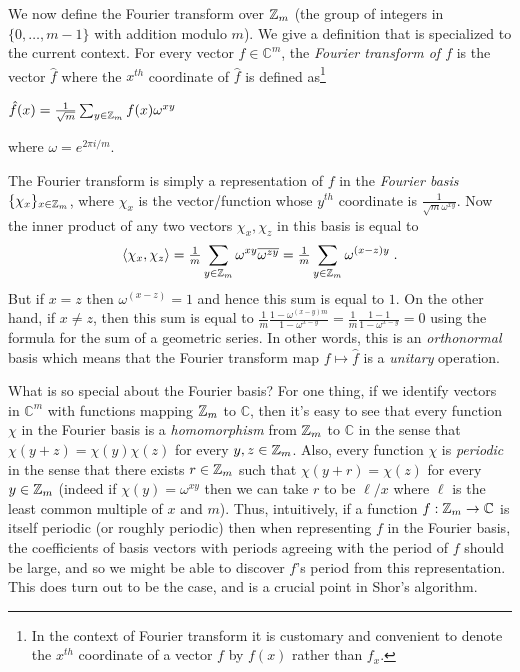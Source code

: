 We now define the Fourier transform over \({\mathbb{Z}}_m\) (the group of integers
in \(\{0,\ldots,m-1\}\) with addition modulo \(m\)). We give a
definition that is specialized to the current context. For every vector
\(f\in\mathbb{C}^m\), the \emph{Fourier transform of \(f\)} is the
vector \(\hat{f}\) where the \(x^{th}\) coordinate of \(\hat{f}\) is
defined as\footnote{In the context of Fourier transform it is customary
  and convenient to denote the \(x^{th}\) coordinate of a vector \(f\)
  by \(f(x)\) rather than \(f_x\).}

\(\hat{f}(x) = \tfrac{1}{\sqrt{m}}\sum_{y\in{\mathbb{Z}}_m} f(x)\omega^{xy}\)

where \(\omega = e^{2\pi i/m}\).

The Fourier transform is simply a representation of \(f\) in the
\emph{Fourier basis} \(\{ \chi_x \}_{x \in {\mathbb{Z}}_m}\), where \(\chi_x\) is
the vector/function whose \(y^{th}\) coordinate is
\(\tfrac{1}{\sqrt{m}\omega^{xy}}\). Now the inner product of any two
vectors \(\chi_x,\chi_z\) in this basis is equal to
\[\langle \chi_x,\chi_z \rangle = \tfrac{1}{m}\sum_{y\in{\mathbb{Z}}_m} \omega^{xy} \overline{\omega^{zy}} = \tfrac{1}{m}\sum_{y\in{\mathbb{Z}}_m} \omega^{(x-z)y}  \;.\]
But if \(x=z\) then \(\omega^{(x-z)}=1\) and hence this sum is equal to
\(1\). On the other hand, if \(x \neq z\), then this sum is equal to
\(\tfrac{1}{m} \tfrac{1 -\omega^{(x-y)m}}{1-\omega^{x-y}}= \tfrac{1}{m}\tfrac{1-1}{1-\omega^{x-y}}=0\)
using the formula for the sum of a geometric series. In other words,
this is an \emph{orthonormal} basis which means that the Fourier
transform map \(f \mapsto \hat{f}\) is a \emph{unitary} operation.

What is so special about the Fourier basis? For one thing, if we
identify vectors in \(\mathbb{C}^m\) with functions mapping \({\mathbb{Z}}_m\) to
\(\mathbb{C}\), then it's easy to see that every function \(\chi\) in
the Fourier basis is a \emph{homomorphism} from \({\mathbb{Z}}_m\) to
\(\mathbb{C}\) in the sense that \(\chi(y+z)= \chi(y)\chi(z)\) for every
\(y,z \in {\mathbb{Z}}_m\). Also, every function \(\chi\) is \emph{periodic} in
the sense that there exists \(r\in {\mathbb{Z}}_m\) such that
\(\chi(y+r)=\chi(z)\) for every \(y\in {\mathbb{Z}}_m\) (indeed if
\(\chi(y) = \omega^{xy}\) then we can take \(r\) to be \(\ell/x\) where
\(\ell\) is the least common multiple of \(x\) and \(m\)). Thus,
intuitively, if a function \(f:{\mathbb{Z}}_m\rightarrow\mathbb{C}\) is itself
periodic (or roughly periodic) then when representing \(f\) in the
Fourier basis, the coefficients of basis vectors with periods agreeing
with the period of \(f\) should be large, and so we might be able to
discover \(f\)'s period from this representation. This does turn out to
be the case, and is a crucial point in Shor's algorithm.

